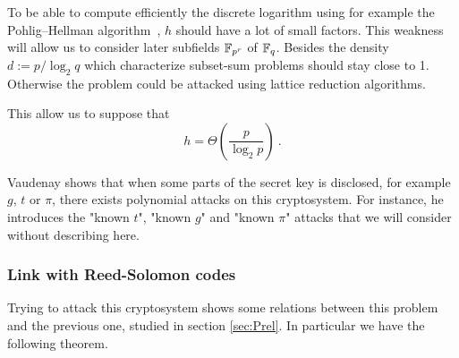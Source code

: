 \documentclass[a4paper]{article}
\begin{document}
To be able to compute efficiently the discrete logarithm using for example the Pohlig–Hellman algorithm~\cite{Pohl78}, $h$ should have a lot of small factors. This weakness will allow us to consider later subfields $\mathbb{F}_{p^r}$ of $\mathbb{F}_q$. Besides the density $d := p / \log_2 q$ which characterize subset-sum problems should stay close to 1. Otherwise the problem could be attacked using lattice reduction algorithms.

This allow us to suppose that
$$ h = \Theta\left( \frac{p}{\log_2 p} \right) \ .$$

Vaudenay shows that when some parts of the secret key is disclosed, for example $g$, $t$ or $\pi$, there exists polynomial attacks on this cryptosystem. For instance, he introduces \cite{Vau01} the "known $t$", "known $g$" and "known $\pi$" attacks that we will consider without describing here.


\subsubsection{Link with Reed-Solomon codes}

Trying to attack this cryptosystem shows some relations between this problem and the previous one, studied in section \ref{sec:Prel}. In particular we have the following theorem.
\end{document}

